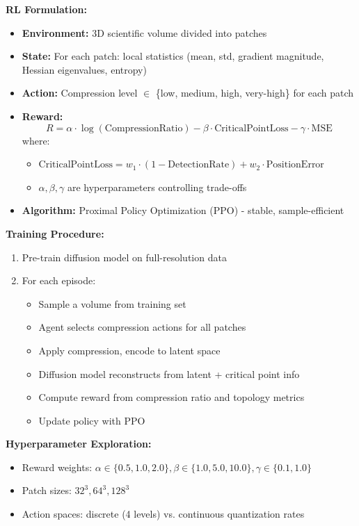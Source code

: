 \documentclass[11pt]{article}
\begin{document}
\textbf{RL Formulation:}
\begin{itemize}
    \item \textbf{Environment:} 3D scientific volume divided into patches
    \item \textbf{State:} For each patch: local statistics (mean, std, gradient magnitude, Hessian eigenvalues, entropy)
    \item \textbf{Action:} Compression level $\in$ \{low, medium, high, very-high\} for each patch
    \item \textbf{Reward:}
    \[
    R = \alpha \cdot \log(\text{CompressionRatio}) - \beta \cdot \text{CriticalPointLoss} - \gamma \cdot \text{MSE}
    \]
    where:
    \begin{itemize}
        \item $\text{CriticalPointLoss} = w_1 \cdot (1 - \text{DetectionRate}) + w_2 \cdot \text{PositionError}$
        \item $\alpha, \beta, \gamma$ are hyperparameters controlling trade-offs
    \end{itemize}
    \item \textbf{Algorithm:} Proximal Policy Optimization (PPO) - stable, sample-efficient
\end{itemize}

\textbf{Training Procedure:}
\begin{enumerate}
    \item Pre-train diffusion model on full-resolution data
    \item For each episode:
    \begin{itemize}
        \item Sample a volume from training set
        \item Agent selects compression actions for all patches
        \item Apply compression, encode to latent space
        \item Diffusion model reconstructs from latent + critical point info
        \item Compute reward from compression ratio and topology metrics
        \item Update policy with PPO
    \end{itemize}
\end{enumerate}

\textbf{Hyperparameter Exploration:}
\begin{itemize}
    \item Reward weights: $\alpha \in \{0.5, 1.0, 2.0\}, \beta \in \{1.0, 5.0, 10.0\}, \gamma \in \{0.1, 1.0\}$
    \item Patch sizes: $32^3, 64^3, 128^3$
    \item Action spaces: discrete (4 levels) vs. continuous quantization rates
\end{itemize}
\end{document}
